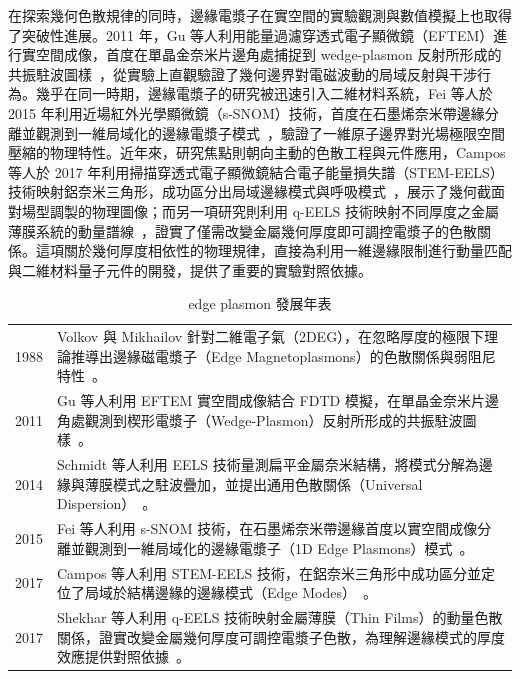 在探索幾何色散規律的同時，邊緣電漿子在實空間的實驗觀測與數值模擬上也取得了突破性進展。2011 年，Gu 等人利用能量過濾穿透式電子顯微鏡（EFTEM）進行實空間成像，首度在單晶金奈米片邊角處捕捉到 wedge-plasmon 反射所形成的共振駐波圖樣~\cite{gu2011resonant}，從實驗上直觀驗證了幾何邊界對電磁波動的局域反射與干涉行為。幾乎在同一時期，邊緣電漿子的研究被迅速引入二維材料系統，Fei 等人於 2015 年利用近場紅外光學顯微鏡（s-SNOM）技術，首度在石墨烯奈米帶邊緣分離並觀測到一維局域化的邊緣電漿子模式~\cite{fei2015edge}，驗證了一維原子邊界對光場極限空間壓縮的物理特性。近年來，研究焦點則朝向主動的色散工程與元件應用，Campos 等人於 2017 年利用掃描穿透式電子顯微鏡結合電子能量損失譜（STEM-EELS）技術映射鋁奈米三角形，成功區分出局域邊緣模式與呼吸模式~\cite{campos2017plasmonic}，展示了幾何截面對場型調製的物理圖像；而另一項研究則利用 q-EELS 技術映射不同厚度之金屬薄膜系統的動量譜線~\cite{shekhar2017momentum}，證實了僅需改變金屬幾何厚度即可調控電漿子的色散關係。這項關於幾何厚度相依性的物理規律，直接為利用一維邊緣限制進行動量匹配與二維材料量子元件的開發，提供了重要的實驗對照依據。

\begin{table}[H]  %
	\centering
	\footnotesize %
	\captionsetup{labelsep=quad, name=TABLE}
	\renewcommand{\arraystretch}{1.4} %
	
	\begin{tabular}{r | p{11cm}}
		\hline\hline
		1988 & Volkov 與 Mikhailov 針對二維電子氣（2DEG），在忽略厚度的極限下理論推導出邊緣磁電漿子（Edge Magnetoplasmons）的色散關係與弱阻尼特性~\cite{volkov1988edge}。 \\
		2011 & Gu 等人利用 EFTEM 實空間成像結合 FDTD 模擬，在單晶金奈米片邊角處觀測到楔形電漿子（Wedge-Plasmon）反射所形成的共振駐波圖樣~\cite{gu2011resonant}。 \\
		2014 & Schmidt 等人利用 EELS 技術量測扁平金屬奈米結構，將模式分解為邊緣與薄膜模式之駐波疊加，並提出通用色散關係（Universal Dispersion）~\cite{schmidt2014}。 \\
		2015 & Fei 等人利用 s-SNOM 技術，在石墨烯奈米帶邊緣首度以實空間成像分離並觀測到一維局域化的邊緣電漿子（1D Edge Plasmons）模式~\cite{fei2015edge}。 \\
		2017 & Campos 等人利用 STEM-EELS 技術，在鋁奈米三角形中成功區分並定位了局域於結構邊緣的邊緣模式（Edge Modes）~\cite{campos2017plasmonic}。 \\
		2017 & Shekhar 等人利用 q-EELS 技術映射金屬薄膜（Thin Films）的動量色散關係，證實改變金屬幾何厚度可調控電漿子色散，為理解邊緣模式的厚度效應提供對照依據~\cite{shekhar2017momentum}。 \\
		\hline\hline
	\end{tabular}
	\vspace{0.3cm}
	
	\caption{edge plasmon 發展年表}
	\label{tab:edge_plasmon_history}
\end{table}

